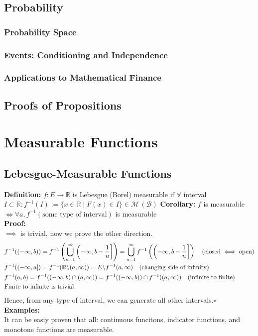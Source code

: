 \documentclass{article}
\newcommand{\R}{\mathbb{R}}
\newcommand{\cupninf}{\displaystyle\bigcup_{n=1}^\infty}
\newcommand{\bcsl}{\symbol{92}}
\newcommand{\0}{{\bf{0}}}
\newcommand{\1}{{\bf{1}}}
\begin{document}
\subsection{Probability}
\subsubsection{Probability Space}
\subsubsection{Events: Conditioning and Independence}
\subsubsection{Applications to Mathematical Finance}
\subsection{Proofs of Propositions}
\clearpage
\section{Measurable Functions}
\subsection{Lebesgue-Measurable Functions}
\textbf{Definition:} $f:E\to\R$ is Lebesgue (Borel) measurable if $\forall$ interval $I\subset\R:f^{-1}(I):=\{x\in\R\mid F(x)\in I\}\in\mathcal{M}\,(\mathcal{B})$
\textbf{Corollary:} $f$ is measurable$\iff\forall a,f^{-1}(\mbox{some type of interval})$ is measurable\\
\textbf{Proof:}\\
$\implies$ is trivial, now we prove the other direction.
\begin{equation}
\begin{split}
    &f^{-1}((-\infty,b))=f^{-1}\left(\cupninf\left(-\infty,b-\frac{1}{n}\right]\right)=\cupninf f^{-1}\left(\left(-\infty,b-\frac{1}{n}\right]\right)\quad(\mbox{closed}\iff\mbox{open})\\
    &f^{-1}((-\infty,a])=f^{-1}(\R\bcsl(a,\infty))=E\bcsl f^{-1}(a,\infty)\quad(\mbox{changing side of infinity})\\
    &f^{-1}(a,b)=f^{-1}((-\infty,b)\cap(a,\infty))=f^{-1}((-\infty,b))\cap f^{-1}((a,\infty))\quad(\mbox{infinite to finite})\\
    &\mbox{Finite to infinite is trivial}\\
\end{split}
\end{equation}
Hence, from any type of interval, we can generate all other intervals.\quad$\square$\\
\textbf{Examples:}\\
It can be easiy proven that all: continuous funcitons, indicator functions, and monotone functions are measurable.
\end{document}

